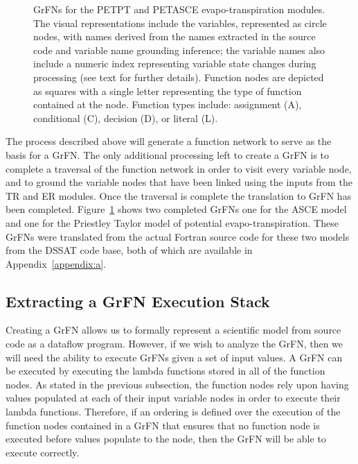 \begin{figure}[!htbp]
  \label{fig:grfn_cgs}
  \centering
  \hfill
  \caption[Evapo-transpiration GrFN Examples]{GrFNs for the PETPT and PETASCE evapo-transpiration modules. The visual representations include the variables, represented as circle nodes, with names derived from the names extracted in the source code and variable name grounding inference; the variable names also include a numeric index representing variable state changes during processing (see text for further details). Function nodes are depicted as squares with a single letter representing the type of function contained at the node. Function types include: assignment (A), conditional (C), decision (D), or literal (L).}
\end{figure}

The process described above will generate a function network to serve as the basis for a GrFN.
The only additional processing left to create a GrFN is to complete a traversal of the function network in order to visit every variable node, and to ground the variable nodes that have been linked using the inputs from the TR and ER modules.
Once the traversal is complete the translation to GrFN has been completed.
Figure~\ref{fig:grfn_cgs} shows two completed GrFNs one for the ASCE model and one for the Priestley Taylor model of potential evapo-transpiration.
These GrFNs were translated from the actual Fortran source code for these two models from the DSSAT code base, both of which are available in Appendix~\ref{appendix:a}.

\subsection{Extracting a GrFN Execution Stack \label{sec:exec_graph_extraction}}
Creating a GrFN allows us to formally represent a scientific model from source code as a dataflow program.
However, if we wish to analyze the GrFN, then we will need the ability to execute GrFNs given a set of input values.
A GrFN can be executed by executing the lambda functions stored in all of the function nodes.
As stated in the previous subsection, the function nodes rely upon having values populated at each of their input variable nodes in order to execute their lambda functions.
Therefore, if an ordering is defined over the execution of the function nodes contained in a GrFN that ensures that no function node is executed before values populate to the node, then the GrFN will be able to execute correctly.

